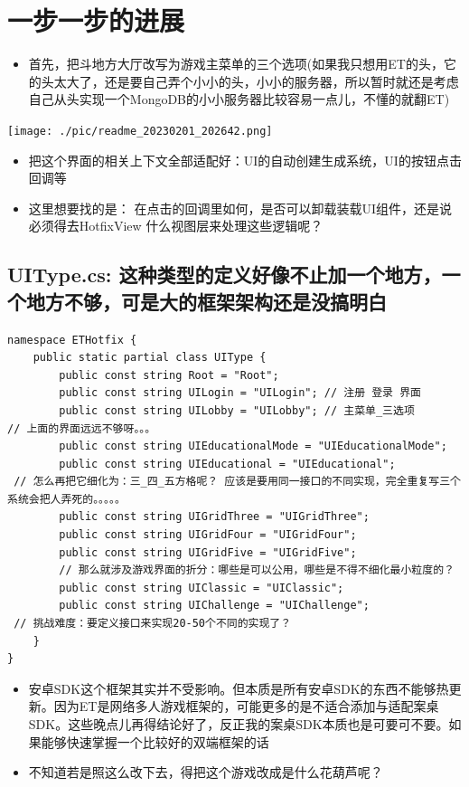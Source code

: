 \documentclass[9pt, b5paper]{article}
\begin{document}
\section{一步一步的进展}
\label{sec-4}
\begin{itemize}
\item 首先，把斗地方大厅改写为游戏主菜单的三个选项(如果我只想用ET的头，它的头太大了，还是要自己弄个小小的头，小小的服务器，所以暂时就还是考虑自己从头实现一个MongoDB的小小服务器比较容易一点儿，不懂的就翻ET)
\end{itemize}

\texttt{[image: ./pic/readme\_20230201\_202642.png]}
\begin{itemize}
\item 把这个界面的相关上下文全部适配好：UI的自动创建生成系统，UI的按钮点击回调等
\item 这里想要找的是： 在点击的回调里如何，是否可以卸载装载UI组件，还是说必须得去HotfixView 什么视图层来处理这些逻辑呢？
\end{itemize}
\subsection{UIType.cs: 这种类型的定义好像不止加一个地方，一个地方不够，可是大的框架架构还是没搞明白}
\label{sec-4-1}
\begin{verbatim}
namespace ETHotfix {
    public static partial class UIType {
        public const string Root = "Root";
        public const string UILogin = "UILogin"; // 注册 登录 界面
        public const string UILobby = "UILobby"; // 主菜单_三选项
// 上面的界面远远不够呀。。。
        public const string UIEducationalMode = "UIEducationalMode"; 
        public const string UIEducational = "UIEducational"; 
 // 怎么再把它细化为：三_四_五方格呢？ 应该是要用同一接口的不同实现，完全重复写三个系统会把人弄死的。。。。。
        public const string UIGridThree = "UIGridThree";
        public const string UIGridFour = "UIGridFour"; 
        public const string UIGridFive = "UIGridFive"; 
        // 那么就涉及游戏界面的折分：哪些是可以公用，哪些是不得不细化最小粒度的？
        public const string UIClassic = "UIClassic"; 
        public const string UIChallenge = "UIChallenge"; 
 // 挑战难度：要定义接口来实现20-50个不同的实现了？        
    }
}
\end{verbatim}

\begin{itemize}
\item 安卓SDK这个框架其实并不受影响。但本质是所有安卓SDK的东西不能够热更新。因为ET是网络多人游戏框架的，可能更多的是不适合添加与适配案桌SDK。这些晚点儿再得结论好了，反正我的案桌SDK本质也是可要可不要。如果能够快速掌握一个比较好的双端框架的话
\item 不知道若是照这么改下去，得把这个游戏改成是什么花葫芦呢？
\end{itemize}
\end{document}
